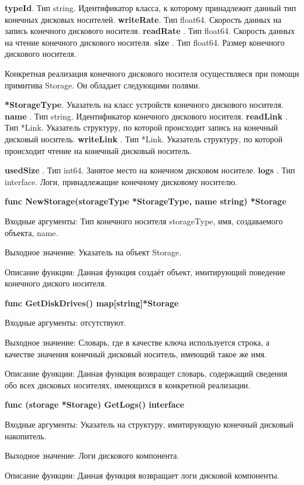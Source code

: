 \textbf{	typeId}. Тип    string. Идентификатор класса, к которому принадлежит данный тип конечных дисковых носителей. 
\textbf{	writeRate}. Тип float64. Скорость данных на запись конечного дискового носителя.
\textbf{	readRate }. Тип float64. Скорость данных на чтение конечного дискового носителя.
\textbf{	size     }. Тип float64. Размер конечного дискового носителя.

Конкретная реализация конечного дискового носителя осуществляеся при помощи примитива Storage. Он обладает следующими полями. 

\textbf{	*StorageType}. Указатель на класс устройств конечного дискового носителя. 
\textbf{	name     }. Тип string. Идентификатор конечного дискового носителя.
\textbf{	readLink }. Тип *Link. Указатель структуру, по которой происходит запись на  конечный дисковый носитель.
\textbf{	writeLink }. Тип *Link. Указатель структуру, по которой происходит чтение на  конечный дисковый носитель.

\textbf{	usedSize }. Тип int64. Занятое место на конечном дисковом носителе.
\textbf{	logs }. Тип interface{}. Логи, принадлежащие конечному дисковому носителю.


\textbf{func NewStorage(storageType *StorageType, name string) *Storage}

Входные аргументы: Тип конечного носителя storageType, имя, создаваемого объекта, name. 

Выходное значение: Указатель на объект Storage. 

Описание функции: Данная функция создаёт объект, имитирующий поведение конечного диского носителя.

\textbf{func GetDiskDrives() map[string]*Storage}

Входные аргументы: отсутствуют.

Выходное значение: Словарь, где в качестве ключа используется строка, а качестве значения конечный дисковый носитель, имеющий такое же имя.

Описание функции: Данная функция возвращет словарь, содержащий сведения обо всех дисковых носителях, имеющихся в конкретной реализации. 

\textbf{func (storage *Storage) GetLogs() interface{}}

Входные аргументы: Указатель на структуру, имитирующую конечный дисковый накопитель.

Выходное значение: Логи дискового компонента. 

Описание функции: Данная функция возвращает логи дисковой компоненты. 

